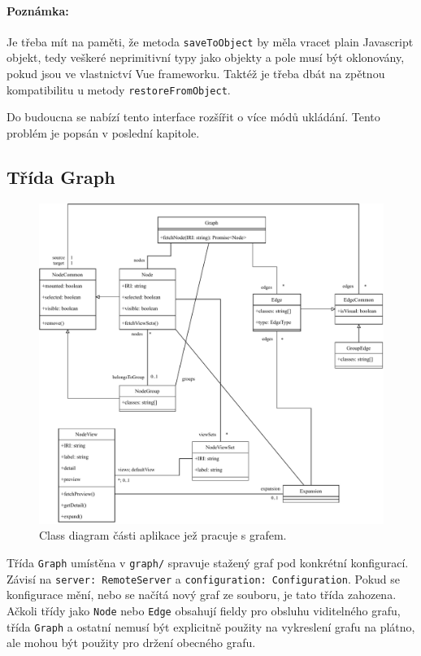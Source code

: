 \paragraph{Poznámka:} Je třeba mít na paměti, že metoda \texttt{saveToObject} by měla vracet plain Javascript objekt, tedy veškeré neprimitivní typy jako objekty a pole musí být oklonovány, pokud jsou ve vlastnictví Vue frameworku. Taktéž je třeba dbát na zpětnou kompatibilitu u metody \texttt{restoreFromObject}.

\smallskip

Do budoucna se nabízí tento interface rozšířit o více módů ukládání. Tento problém je popsán v poslední kapitole.

\subsection{Třída Graph}

\begin{figure}
    \centering
    \includegraphics[width=\textwidth]{media/graph.pdf}
    \caption{Class diagram části aplikace jež pracuje s grafem.}
\end{figure}

Třída \texttt{Graph} umístěna v \texttt{graph/} spravuje stažený graf pod konkrétní konfigurací. Závisí na \texttt{server: RemoteServer} a \texttt{configuration: Configuration}. Pokud se konfigurace mění, nebo se načítá nový graf ze souboru, je tato třída zahozena. Ačkoli třídy jako \texttt{Node} nebo \texttt{Edge} obsahují fieldy pro obsluhu viditelného grafu, třída \texttt{Graph} a ostatní nemusí být explicitně použity na vykreslení grafu na plátno, ale mohou být použity pro držení obecného grafu.

